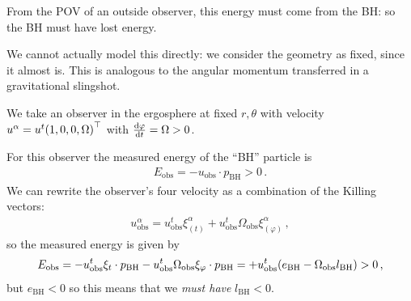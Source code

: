 \documentclass[main.tex]{subfiles}
\begin{document}
From the POV of an outside observer, this energy must come from the BH: so the BH must have lost energy. 

We cannot actually model this directly: we consider the geometry as fixed, since it almost is. 
This is analogous to the angular momentum transferred in a gravitational slingshot. 

We take an observer in the ergosphere at fixed \(r, \theta \) with velocity \(u^{\alpha } = u^{t}\qty(1, 0, 0, \Omega )^{\top}\) with \(\dv{\varphi }{t }= \Omega >0\). 


For this observer the measured energy of the ``BH'' particle is 
%
\begin{align}
  E _{\text{obs}} = - u _{\text{obs}} \cdot p _{\text{BH}}>0
\,.
\end{align}
%
We can rewrite the observer's four velocity as a combination of the Killing vectors:
%
\begin{align}
  u^{\alpha } _{\text{obs}} = u^{t} _{\text{obs}} \xi_{(t)}^{\alpha } + u^{t} _{\text{obs}} \Omega _{\text{obs}} \xi_{(\varphi) }^{\alpha }
\,,
\end{align}
%
so the measured energy is given by 
%
\begin{align}
E _{\text{obs}} = - u^{t} _{\text{obs}} \xi_{t} \cdot p _{\text{BH}} - u^{t} _{\text{obs}} \Omega _{\text{obs}} \xi_{\varphi } \cdot p _{\text{BH}} 
= + u^{t} _{\text{obs}} \qty( e _{\text{BH}}  - \Omega _{\text{obs}} l _{\text{BH}} )
> 0 
\,,
\end{align}
%
but \(e _{\text{BH}} <0\) so this means that we \emph{must have} \(l _{\text{BH}}<0\). 
\end{document}
